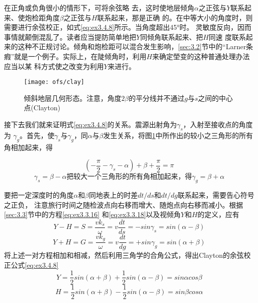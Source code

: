 在正角或负角很小的情形下，可将余弦略
去，这时使地层倾角$\alpha$之正弦与$Y$联系起来、使炮检距角度$\beta$之正弦与$H$联系起来，那是正确
的。在中等大小的角度时，则需要进行余弦校正，如式\ref{eq:ex3.4.8}所示。当角度超出45°时。
灵敏度反向，因而事情就颠倒混乱了。读者应当提防简单地把$Y$同倾角联系起来、把$H$同速
度联系起来的这种不正规讨论。倾角和炮检距可以混合发生影响，\ref{sec:3.2}节中的“Larner条
瘕”就是一个例子。实际上，在陡倾角时，利用$H$来确定塋变的这种普通处理办法应当以某
科方式使之改变为利用$Y$来进行。

\begin{figure}[H]
\centering
\texttt{[image: ofs/clay]}
\caption[clay]{倾斜地层几何形态。注意，角度$2\beta$的平分线并不通过$g$与$s$之间的中心点(Clayton)}
\label{fig:ofs/clay}
\end{figure}

接下去我们就来证明式\ref{eq:ex3.4.8}的关系。震源出射角为$\gamma_s$，入射至接收点的角度为
$\gamma_g$。首先，使$\gamma_s$与$\gamma_g$，同$\alpha$与$\beta$发生关系，将图\ref{fig:ofs/clay}中所作出的较小之三角形的所有角相加起来，得

\begin{equation*}
(-\frac{\pi}{2}-\gamma_s-\alpha)+\beta+\frac{\pi}{2}=\pi
\end{equation*}
\begin{subequations}
\begin{equation}
\gamma_s=\beta-\alpha
\label{eq:ex3.4.9a}
\end{equation}
把较大一个三角形的所有角相加起来，得
\begin{equation}
\gamma_g=\beta+\alpha
\label{eq:ex3.4.9b}
\end{equation}
\label{eq:ex3.4.9}
\end{subequations}

要把一定深度时的角度$\alpha$和$\beta$同地表上的时差$dt/ds$和$dt/dg$联系起来，需要告心符号之正负，
注意旅行时间之随检波点向右移而增大、随炮点向右移而减小。根据\ref{sec:3.3}节中的方程\ref{eq:ex3.3.16}
和\ref{eq:ex3.3.18}以及视倾角$Y$和$H$的定义，应有
\begin{equation*}
Y-H=S=\frac{vk_s}{\omega}=v\frac{dt}{ds}=-sin\gamma_s=sin(\alpha-\beta)
\end{equation*}
\begin{equation*}
Y+H=G=\frac{vk_g}{\omega}=v\frac{dt}{dg}=+sin\gamma_g=sin(\alpha+\beta)
\end{equation*}
将上述一对方程相加和相减，然后利用三角学的合角公式，得出Clayton的余弦校正公式\ref{eq:ex3.4.8}
\begin{equation*}
Y=\frac{1}{2}sin(\alpha+\beta)+\frac{1}{2}sin(\alpha-\beta)=sin\alpha cos\beta
\end{equation*}
\begin{equation*}
H=\frac{1}{2}sin(\alpha+\beta)-\frac{1}{2}sin(\alpha-\beta)=sin\beta cos\alpha
\end{equation*}

